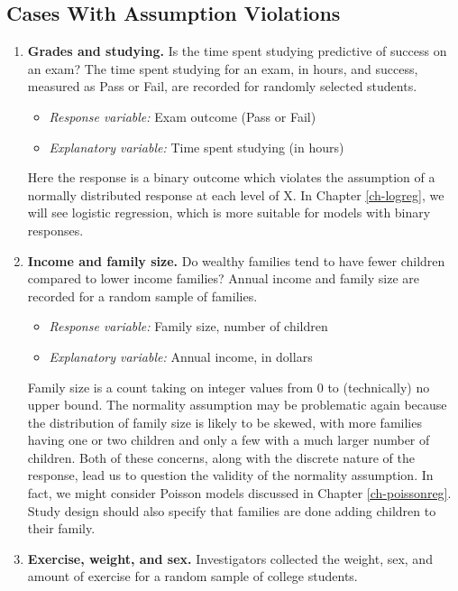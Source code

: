 \documentclass[
]{krantz}
\providecommand{\tightlist}{%
  \setlength{\itemsep}{0pt}\setlength{\parskip}{0pt}}
\begin{document}
\subsection{Cases With Assumption Violations}\label{cases-with-assumption-violations}

\begin{enumerate}
\def\labelenumi{\arabic{enumi})}
\item
  \textbf{Grades and studying.} Is the time spent studying predictive of success on an exam? The time spent studying for an exam, in hours, and success, measured as Pass or Fail, are recorded for randomly selected students.

  \begin{itemize}
  \tightlist
  \item
    \emph{Response variable:} Exam outcome (Pass or Fail)
  \item
    \emph{Explanatory variable:} Time spent studying (in hours)
  \end{itemize}

  Here the response is a binary outcome which violates the assumption of a normally distributed response at each level of X. In Chapter \ref{ch-logreg}, we will see logistic regression, which is more suitable for models with binary responses.
\item
  \textbf{Income and family size.} Do wealthy families tend to have fewer children compared to lower income families? Annual income and family size are recorded for a random sample of families.

  \begin{itemize}
  \tightlist
  \item
    \emph{Response variable:} Family size, number of children
  \item
    \emph{Explanatory variable:} Annual income, in dollars
  \end{itemize}

  Family size is a count taking on integer values from 0 to (technically) no upper bound. The normality assumption may be problematic again because the distribution of family size is likely to be skewed, with more families having one or two children and only a few with a much larger number of children. Both of these concerns, along with the discrete nature of the response, lead us to question the validity of the normality assumption. In fact, we might consider Poisson models discussed in Chapter \ref{ch-poissonreg}. Study design should also specify that families are done adding children to their family.
\item
  \textbf{Exercise, weight, and sex.} Investigators collected the weight, sex, and amount of exercise for a random sample of college students.


\end{enumerate}
\end{document}
